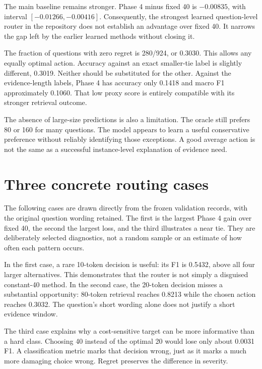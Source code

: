 The main baseline remains stronger. Phase 4 minus fixed 40 is
$-0.00835$, with interval $[-0.01266,-0.00416]$. Consequently,
the strongest learned question-level router in the repository does
not establish an advantage over fixed 40. It narrows the gap left
by the earlier learned methods without closing it.

The fraction of questions with zero regret is 280/924, or 0.3030.
This allows any equally optimal action. Accuracy against an exact
smaller-tie label is slightly different, 0.3019. Neither should
be substituted for the other. Against the evidence-length labels,
Phase 4 has accuracy only 0.1418 and macro F1 approximately 0.1060.
That low proxy score is entirely compatible with its stronger
retrieval outcome.

The absence of large-size predictions is also a limitation. The
oracle still prefers 80 or 160 for many questions. The model
appears to learn a useful conservative preference without reliably
identifying those exceptions. A good average action is not the
same as a successful instance-level explanation of evidence need.

\section{Three concrete routing cases}
The following cases are drawn directly from the frozen validation
records, with the original question wording retained. The first is
the largest Phase 4 gain over fixed 40, the second the largest loss,
and the third illustrates a near tie. They are deliberately selected
diagnostics, not a random sample or an estimate of how often each
pattern occurs.



In the first case, a rare 10-token decision is useful: its F1 is
0.5432, above all four larger alternatives. This demonstrates that
the router is not simply a disguised constant-40 method. In the
second case, the 20-token decision misses a substantial opportunity:
80-token retrieval reaches 0.8213 while the chosen action reaches
0.3032. The question's short wording alone does not justify a
short evidence window.

The third case explains why a cost-sensitive target can be more
informative than a hard class. Choosing 40 instead of the optimal
20 would lose only about 0.0031 F1. A classification metric marks
that decision wrong, just as it marks a much more damaging choice
wrong. Regret preserves the difference in severity.

